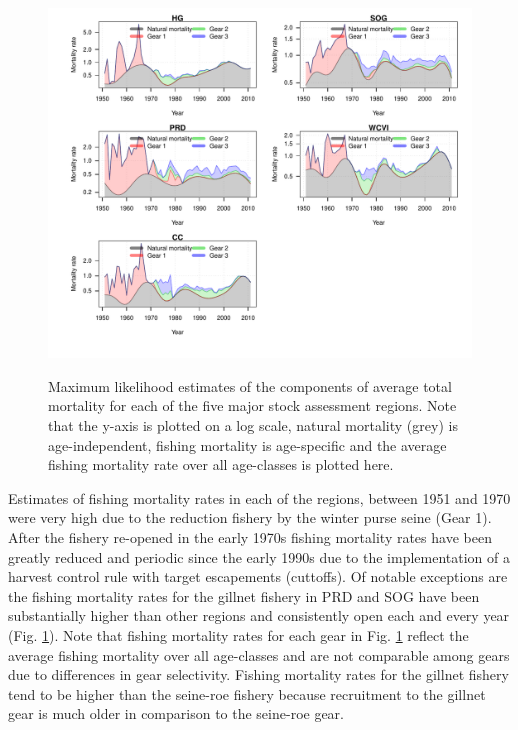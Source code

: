 \begin{figure}[!tbp]
	\includegraphics[width=\textwidth]{../FIGS/qPriorFigs/iscam_fig_mortality.pdf}\\
	\caption{Maximum likelihood estimates of the components of average total mortality for each of the five major stock assessment regions. Note that the y-axis is plotted on a log scale, natural mortality (grey) is age-independent, fishing mortality is age-specific and the average fishing mortality rate over all age-classes is plotted here.}\label{PartII:Results:figMortality}
\end{figure}

Estimates of fishing mortality rates in each of the regions, between 1951 and 1970 were very high due to the reduction fishery by the winter purse seine (Gear 1).  After the fishery re-opened in the early 1970s fishing mortality rates have been greatly reduced and periodic since the early 1990s due to the implementation of a harvest control rule with target escapements (cuttoffs).  Of notable exceptions are the fishing mortality rates for the gillnet fishery in PRD  and SOG have been substantially higher than other regions and consistently open each and every year (Fig. \ref{PartII:Results:figMortality}). Note that fishing mortality rates for each gear in Fig. \ref{PartII:Results:figMortality} reflect the average fishing mortality over all age-classes and are not comparable among gears due to differences in gear selectivity. Fishing mortality rates for the gillnet fishery tend to be higher than the seine-roe fishery because recruitment to the gillnet gear is much older in comparison to the seine-roe gear.





